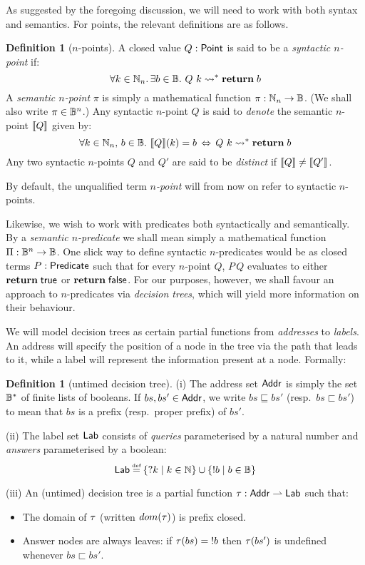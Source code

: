 \documentclass[12pt,phd,lfcs,twoside,openright,logo,leftchapter,normalheadings]{infthesis}
\theoremstyle{plain}
\theoremstyle{definition}
\newtheorem{definition}[theorem]{Definition}
\begin{document}
As suggested by the foregoing discussion, we will need to work with
both syntax and semantics.  For points, the relevant definitions are
as follows.

\begin{definition}[$n$-points]\label{def:semantic-n-point}
  A closed value $Q : \mathsf{Point}$ is said to be a \emph{syntactic $n$-point} if:
{
  \[
    \forall k \in \mathbb{N}_n.\,\exists b \in \mathbb{B}.~ Q~k \leadsto^\ast \mathbf{return}\;b
  \]}%
A \emph{semantic $n$-point} $\pi$ is simply a mathematical function
$\pi: \mathbb{N}_n \to \mathbb{B}$.  (We shall also write $\pi \in \mathbb{B}^n$.)  Any
syntactic $n$-point $Q$ is said to \emph{denote} the semantic
$n$-point $\val{Q}$ given by:
{
  \[
  \forall k \in \mathbb{N}_n,\, b \in \mathbb{B}.~ \llbracket Q \rrbracket (k) = b \,\Leftrightarrow\, Q~k \leadsto^\ast \mathbf{return}\;b
  \]}%
%
Any two syntactic $n$-points $Q$ and $Q'$ are said to be
\emph{distinct} if $\val{Q} \neq \val{Q'}$.
%
\end{definition}

By default, the unqualified term \emph{$n$-point} will from now on
refer to syntactic $n$-points.

Likewise, we wish to work with predicates both syntactically and
semantically.  By a \emph{semantic $n$-predicate} we shall mean simply
a mathematical function $\Pi: \mathbb{B}^n \to \mathbb{B}$.  One slick way to define
syntactic $n$-predicates would be as closed terms $P:\mathsf{Predicate}$ such
that for every $n$-point $Q$, $P\,Q$ evaluates to either
$\mathbf{return}\;\mathsf{true}$ or $\mathbf{return}\;\mathsf{false}$.  For our purposes, however, we
shall favour an approach to $n$-predicates via \emph{decision trees},
which will yield more information on their behaviour.

We will model decision trees as certain partial functions from
\emph{addresses} to \emph{labels}.  An address will specify the
position of a node in the tree via the path that leads to it, while a
label will represent the information present at a node. Formally:

\begin{definition}[untimed decision tree]\label{def:decision-tree}
  (i) The address set $\mathsf{Addr}$ is simply the set $\mathbb{B}^\ast$ of finite lists of booleans.
      If $bs,bs' \in \mathsf{Addr}$, we write $bs \sqsubseteq bs'$ (resp.\ $bs \sqsubset bs'$)
      to mean that $bs$ is a prefix (resp.\ proper prefix) of $bs'$.

  (ii) The label set $\mathsf{Lab}$ consists of \emph{queries} parameterised by a natural
       number and \emph{answers} parameterised by a boolean:
{
  \[
  \Lab \defas \{\query k \mid k \in \N \} \cup \{\ans b \mid b \in \B \}
  \]
}%

 (iii) An (untimed) decision tree is a partial function $\tau : \mathsf{Addr}
\rightharpoonup \mathsf{Lab}$ such that:
\begin{itemize}
  \item The domain of $\tau$ (written $dom(\tau)$) is prefix closed.
  \item Answer nodes are always leaves:
    if $\tau(bs) = \mathord{!} b$ then $\tau(bs')$ is undefined whenever $bs \sqsubset bs'$.
\end{itemize}
\end{definition}
\end{document}
